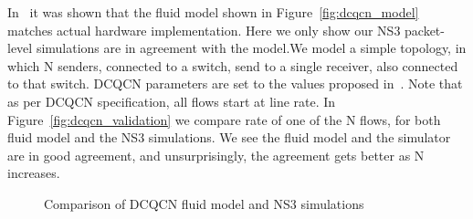 In~\cite{dcqcn} it was shown that the fluid model shown in
Figure~\ref{fig:dcqcn_model} matches actual hardware implementation. Here we
only show our NS3 packet-level simulations are in agreement with the model.We
model a simple topology, in which N senders, connected to a switch, send to a
single receiver, also connected to that switch. DCQCN parameters are set to the
values proposed in~\cite{dcqcn}. Note that as per DCQCN specification, all flows
start at line rate. In Figure~\ref{fig:dcqcn_validation} we compare rate of one
of the N flows, for both fluid model and the NS3 simulations. We see the fluid
model and the simulator are in good agreement, and unsurprisingly, the agreement
gets better as N increases.

\begin{figure}[t]
\center
{}
\caption{Comparison of DCQCN fluid model and NS3 simulations}
\end{figure}
